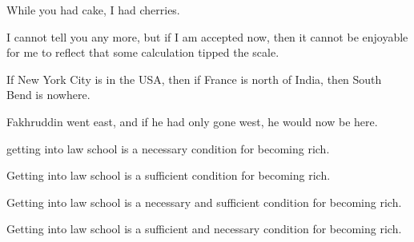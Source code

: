 \begin{enumerate}
	\begin{statement}{While you had cake, I had cherries.}
	\end{statement}

	\begin{statement}{I cannot tell you any more, but if I am accepted now, then it cannot be enjoyable for me to reflect that some calculation tipped the scale.}
	\end{statement}

	\begin{statement}{If New York City is in the USA, then if France is north of India, then South Bend is nowhere.}
	\end{statement}

	\begin{statement}{Fakhruddin went east, and if he had only gone west, he would now be here.}
	\end{statement}

	\begin{statement}{getting into law school is a necessary condition for becoming rich.}
	\end{statement}

	\begin{statement}{Getting into law school is a sufficient condition for becoming rich.}
	\end{statement}

	\begin{statement}{Getting into law school is a necessary and sufficient condition for becoming rich.}
	\end{statement}

	\begin{statement}{Getting into law school is a sufficient and necessary condition for becoming rich.}
	\end{statement}


\end{enumerate}
